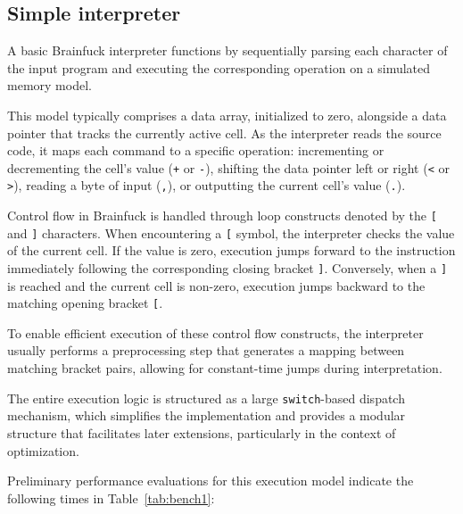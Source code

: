\subsection{Simple interpreter}
\label{sec:ch2sec2sub1}

\par A basic Brainfuck interpreter functions by sequentially parsing each character of the input program and executing the corresponding operation on a simulated memory model.

\par This model typically comprises a data array, initialized to zero, alongside a data pointer that tracks the currently active cell. As the interpreter reads the source code, it maps each command to a specific operation: incrementing or decrementing the cell's value (\texttt{+} or \texttt{-}), shifting the data pointer left or right (\texttt{\textless} or \texttt{\textgreater}), reading a byte of input (\texttt{,}), or outputting the current cell's value (\texttt{.}).

\par Control flow in Brainfuck is handled through loop constructs denoted by the \texttt{[} and \texttt{]} characters. When encountering a \texttt{[} symbol, the interpreter checks the value of the current cell. If the value is zero, execution jumps forward to the instruction immediately following the corresponding closing bracket \texttt{]}. Conversely, when a \texttt{]} is reached and the current cell is non-zero, execution jumps backward to the matching opening bracket \texttt{[}.

\par To enable efficient execution of these control flow constructs, the interpreter usually performs a preprocessing step that generates a mapping between matching bracket pairs, allowing for constant-time jumps during interpretation.

\par The entire execution logic is structured as a large \texttt{switch}-based dispatch mechanism, which simplifies the implementation and provides a modular structure that facilitates later extensions, particularly in the context of optimization.

\par Preliminary performance evaluations for this execution model indicate the following times in Table~\ref{tab:bench1}:

